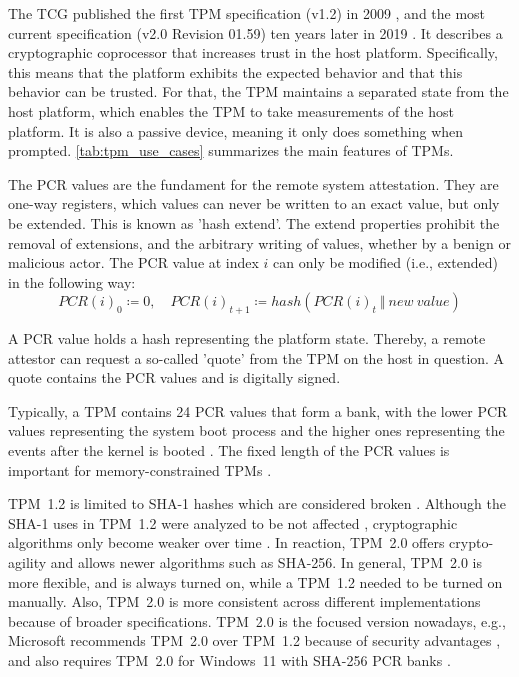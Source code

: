 The \ac{TCG} published the first TPM specification (v1.2) in 2009 \cite{ISO11889}, and the most current specification (v2.0 Revision 01.59) ten years later in 2019 \cite{tpm}.
It describes a cryptographic coprocessor that increases trust in the host platform. Specifically, this means that the platform exhibits the expected behavior and that this behavior can be trusted.
For that, the TPM maintains a separated state from the host platform, which enables the TPM to take measurements of the host platform.
It is also a passive device, meaning it only does something when prompted.
\autoref{tab:tpm_use_cases} summarizes the main features of TPMs.



The \ac{PCR} values are the fundament for the remote system attestation. They are one-way registers, which values can never be written to an exact value, but only be extended.
This is known as 'hash extend'.
The extend properties prohibit the removal of extensions, and the arbitrary writing of values, whether by a benign or malicious actor.
The PCR value at index $i$ can only be modified (i.e., extended) in the following way:
\[ PCR(i)_0 \coloneqq 0,\quad PCR(i)_{t+1} \coloneqq hash(PCR(i)_t\ \Vert\ new\ value)\]

A PCR value holds a hash representing the platform state.
Thereby, a remote attestor can request a so-called 'quote' from the TPM on the host in question.
A quote contains the PCR values and is digitally signed.

Typically, a TPM contains 24 PCR values that form a bank, with the lower PCR values representing the system boot process and the higher ones representing the events after the kernel is booted \cite{Arthur2015}.
The fixed length of the \ac{PCR} values is important for memory-constrained TPMs \cite{Arthur2015}.

%


TPM~1.2 is limited to SHA-1 hashes which are considered broken \cite{cryptoeprint:2005/010, Wang2005, Stevens2017}. Although the SHA-1 uses in TPM~1.2 were analyzed to be not affected \cite{sha1tpm12}, cryptographic algorithms only become weaker over time \cite{Arthur2015}. In reaction, TPM~2.0 offers crypto-agility and allows newer algorithms such as SHA-256. In general, TPM~2.0 is more flexible, and is always turned on, while a TPM~1.2 needed to be turned on manually. Also, TPM~2.0 is more consistent across different implementations because of broader specifications.
TPM~2.0 is the focused version nowadays, e.g., Microsoft recommends TPM~2.0 over TPM~1.2 because of security advantages \cite{micrec}, and also requires TPM~2.0 for Windows~11 with SHA-256 PCR banks \cite{win11req}.

